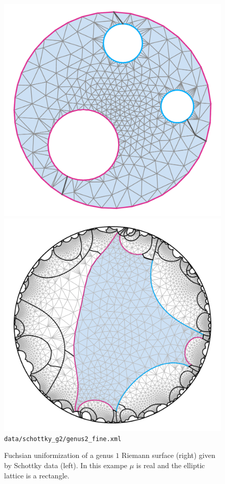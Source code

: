 \documentclass[Thesis.tex]{subfiles}
\begin{document}
\begin{figure}
	\centering
	\includegraphics[width=0.45\linewidth]{data/schottky_g2/genus2_fine_image2}
	\includegraphics[width=0.45\linewidth]{data/schottky_g2/genus2_fine_domain2}
	{\scriptsize\tt data/schottky\_g2/genus2\_fine.xml}
	\caption{Fuchsian uniformization of a genus $1$ Riemann surface (right) given by Schottky data (left). In this exampe $\mu$ is real and the elliptic lattice is a rectangle.}
	\label{fig:fuchsian_to_schottky_genus2}
\end{figure}
\end{document}
